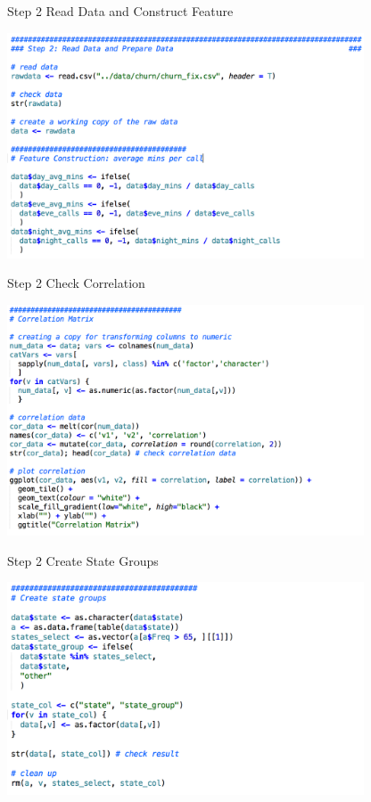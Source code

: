 \documentclass[10pt]{beamer}
\begin{document}
    \begin{frame}{Step 2 Read Data and Construct Feature}
        \begin{center}
          \includegraphics[width=300pt]{../graphs/demo_r_step_2}
        \end{center}
    \end{frame}

    \begin{frame}{Step 2 Check Correlation}
        \begin{center}
          \includegraphics[width=300pt]{../graphs/demo_r_step_2_1}
        \end{center}
    \end{frame}
 
    \begin{frame}{Step 2 Create State Groups}
        \begin{center}
          \includegraphics[width=300pt]{../graphs/demo_r_step_2_2}
        \end{center}
    \end{frame}
    
\end{document}
